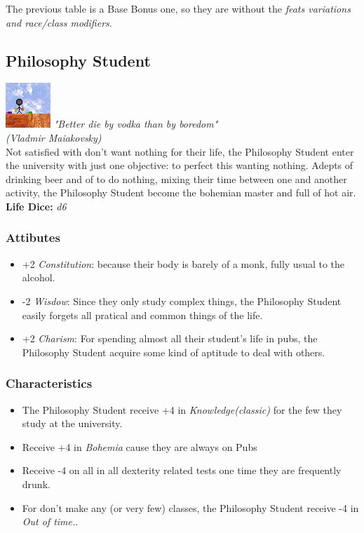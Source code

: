 \documentclass[ letterpaper,12pt]{article}
\begin{document}
The previous table is a Base Bonus one, so they are without the {\it feats variations and race/class modifiers}.\\

\subsection{Philosophy Student}
\includegraphics{../data/classes/Img/filosofia.png}
{\it "Better die by vodka than by boredom"\\ (Vladmir Maiakovsky)}\\

Not satisfied with don't want nothing for their life, the Philosophy Student enter the university with just one objective: to perfect this wanting nothing.  Adepts  of drinking beer and of to do nothing, mixing their time between one and another  activity, the Philosophy Student become the bohemian master and full of hot air.\\

{\bf Life Dice:} {\it d6}

\subsubsection{Attibutes}
\begin{itemize}
\item{+2 {\it Constitution}: because their body is barely of a monk, fully usual to the alcohol.}
\item{-2 {\it Wisdow}: Since they only study complex things, the Philosophy  Student  easily  forgets  all pratical and common things of  the  life.}
\item{+2 {\it Charism}: For spending almost all their student's life in pubs, the  Philosophy  Student acquire some kind of aptitude to deal with others.}
\end{itemize}

\subsubsection{Characteristics}
\begin{itemize}
\item{The Philosophy Student receive +4 in {\it Knowledge(classic)} for the few they study at the university.}
\item{Receive +4 in {\it Bohemia} cause they are always on Pubs}
\item{Receive -4 on all in all dexterity related tests one time they are frequently drunk.}
\item{For don't make any (or very few) classes, the Philosophy Student receive -4 in {\it Out of time.}.}
\end{itemize}
\end{document}
